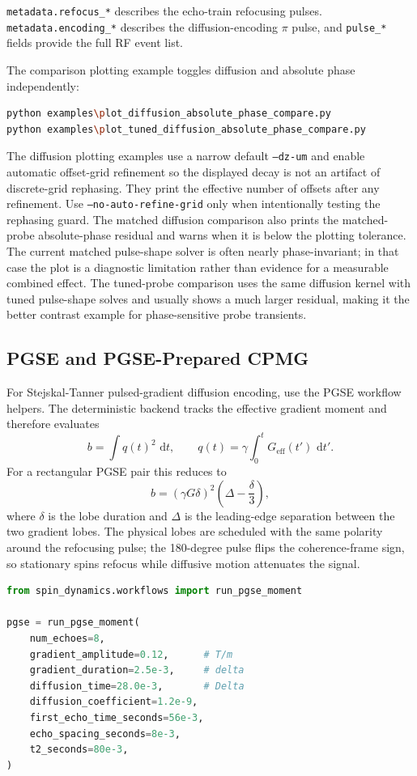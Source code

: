 \documentclass[11pt,oneside]{report}
\newcommand{\code}[1]{\texttt{#1}}
\newcommand{\dd}{\,\mathrm{d}}
\begin{document}
\code{metadata.refocus\_*} describes the echo-train refocusing pulses.
\code{metadata.encoding\_*} describes the diffusion-encoding \(\pi\) pulse,
and \code{pulse\_*} fields provide the full RF event list.

The comparison plotting example toggles diffusion and absolute phase
independently:

\begin{lstlisting}[language=bash]
python examples\plot_diffusion_absolute_phase_compare.py
python examples\plot_tuned_diffusion_absolute_phase_compare.py
\end{lstlisting}

The diffusion plotting examples use a narrow default \code{--dz-um} and enable
automatic offset-grid refinement so the displayed decay is not an artifact of
discrete-grid rephasing.  They print the effective number of offsets after any
refinement.  Use \code{--no-auto-refine-grid} only when intentionally testing
the rephasing guard.
The matched diffusion comparison also prints the matched-probe absolute-phase
residual and warns when it is below the plotting tolerance.  The current
matched pulse-shape solver is often nearly phase-invariant; in that case the
plot is a diagnostic limitation rather than evidence for a measurable combined
effect.
The tuned-probe comparison uses the same diffusion kernel with tuned
pulse-shape solves and usually shows a much larger residual, making it the
better contrast example for phase-sensitive probe transients.

\subsection{PGSE and PGSE-Prepared CPMG}

For Stejskal-Tanner pulsed-gradient diffusion encoding, use the PGSE workflow
helpers. The deterministic backend tracks the effective gradient moment and
therefore evaluates
\[
  b = \int q(t)^2\,\dd t,
  \qquad
  q(t)=\gamma\int_0^t G_{\mathrm{eff}}(t')\,\dd t' .
\]
For a rectangular PGSE pair this reduces to
\[
  b = (\gamma G \delta)^2\left(\Delta-\frac{\delta}{3}\right),
\]
where \(\delta\) is the lobe duration and \(\Delta\) is the leading-edge
separation between the two gradient lobes. The physical lobes are scheduled
with the same polarity around the refocusing pulse; the 180-degree pulse flips
the coherence-frame sign, so stationary spins refocus while diffusive motion
attenuates the signal.

\begin{lstlisting}[language=Python]
from spin_dynamics.workflows import run_pgse_moment

pgse = run_pgse_moment(
    num_echoes=8,
    gradient_amplitude=0.12,      # T/m
    gradient_duration=2.5e-3,     # delta
    diffusion_time=28.0e-3,       # Delta
    diffusion_coefficient=1.2e-9,
    first_echo_time_seconds=56e-3,
    echo_spacing_seconds=8e-3,
    t2_seconds=80e-3,
)
\end{lstlisting}
\end{document}
